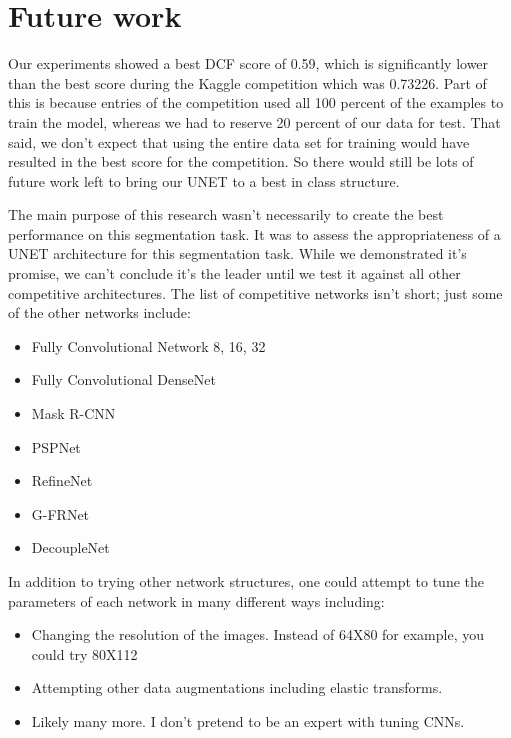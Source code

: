 \documentclass[letterpaper]{article}
\begin{document}
\section{Future work}
Our experiments showed a best DCF score of 0.59, which is significantly lower than the best score during the Kaggle competition which was 0.73226. Part of this is because entries of the competition used all 100 percent of the examples to train the model, whereas we had to reserve 20 percent of our data for test. That said, we don't expect that using the entire data set for training would have resulted in the best score for the competition. So there would still be lots of future work left to bring our UNET to a best in class structure. 

The main purpose of this research wasn't necessarily to create the best performance on this segmentation task. It was to assess the appropriateness of a UNET architecture for this segmentation task. While we demonstrated it's promise, we can't conclude it's the leader until we test it against all other competitive architectures. The list of competitive networks isn't short; just some of the other networks include:
\begin{itemize}
  \item Fully Convolutional Network 8, 16, 32
  \item Fully Convolutional DenseNet
  \item Mask R-CNN
  \item PSPNet
  \item RefineNet
  \item G-FRNet
  \item DecoupleNet
  
  
\end{itemize}

In addition to trying other network structures, one could attempt to tune the parameters of each network in many different ways including:
\begin{itemize}
  \item Changing the resolution of the images. Instead of 64X80 for example, you could try 80X112
  \item Attempting other data augmentations including elastic transforms. 
  \item Likely many more. I don't pretend to be an expert with tuning CNNs.
  
\end{itemize}


\end{document}
